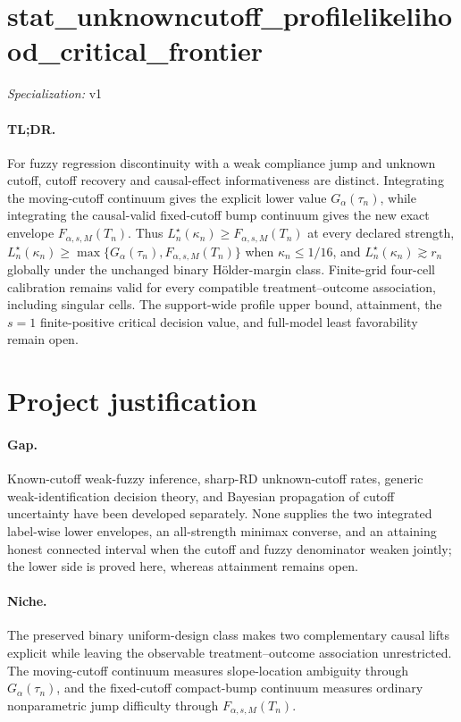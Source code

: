 \documentclass{article}
\begin{document}
\sloppy

\section*{stat\_\allowbreak{}unknowncutoff\_\allowbreak{}profilelikelihood\_\allowbreak{}critical\_\allowbreak{}frontier}

\noindent\textit{Specialization:} v1\par

\paragraph{TL;DR.} For fuzzy regression discontinuity with a weak compliance jump and unknown cutoff, cutoff recovery and causal-effect informativeness are distinct. Integrating the moving-cutoff continuum gives the explicit lower value \(G_\alpha(\tau_n)\), while integrating the causal-valid fixed-cutoff bump continuum gives the new exact envelope \(F_{\alpha,s,M}(T_n)\). Thus \(L_n^\star(\kappa_n)\ge F_{\alpha,s,M}(T_n)\) at every declared strength, \(L_n^\star(\kappa_n)\ge\max\{G_\alpha(\tau_n),F_{\alpha,s,M}(T_n)\}\) when \(\kappa_n\le1/16\), and \(L_n^\star(\kappa_n)\gtrsim r_n\) globally under the unchanged binary H{\"o}lder-margin class. Finite-grid four-cell calibration remains valid for every compatible treatment--outcome association, including singular cells. The support-wide profile upper bound, attainment, the \(s=1\) finite-positive critical decision value, and full-model least favorability remain open.

\section{Project justification}

\paragraph{Gap.} Known-cutoff weak-fuzzy inference, sharp-RD unknown-cutoff rates, generic weak-identification decision theory, and Bayesian propagation of cutoff uncertainty have been developed separately. None supplies the two integrated label-wise lower envelopes, an all-strength minimax converse, and an attaining honest connected interval when the cutoff and fuzzy denominator weaken jointly; the lower side is proved here, whereas attainment remains open.

\paragraph{Niche.} The preserved binary uniform-design class makes two complementary causal lifts explicit while leaving the observable treatment--outcome association unrestricted. The moving-cutoff continuum measures slope-location ambiguity through \(G_\alpha(\tau_n)\), and the fixed-cutoff compact-bump continuum measures ordinary nonparametric jump difficulty through \(F_{\alpha,s,M}(T_n)\).
\end{document}
